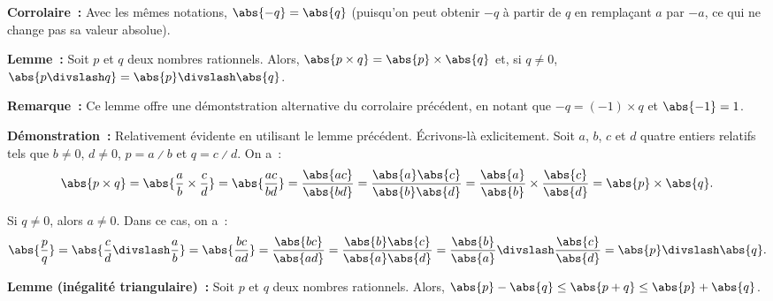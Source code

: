 \medskip

\noindent\textbf{Corrolaire :} Avec les mêmes notations, $\abs{-q} = \abs{q}$ (puisqu'on peut obtenir $-q$ à partir de $q$ en remplaçant $a$ par $-a$, ce qui ne change pas sa valeur absolue).

\medskip

\noindent\textbf{Lemme :} Soit $p$ et $q$ deux nombres rationnels.
    Alors, $\abs{p \times q} = \abs{p} \times \abs{q}$ et, si $q \neq 0$, $\abs{p \divslash q} = \abs{p} \divslash \abs{q}$.

\medskip

\noindent\textbf{Remarque :} Ce lemme offre une démontstration alternative du corrolaire précédent, en notant que $-q = (-1) \times q$ et $\abs{-1} = 1$.

\medskip

\noindent\textbf{Démonstration :} Relativement évidente en utilisant le lemme précédent. 
    Écrivons-là exlicitement.
    Soit $a$, $b$, $c$ et $d$ quatre entiers relatifs tels que $b \neq 0$, $d \neq 0$, $p = a \divslash b$ et $q = c \divslash d$.
    On a : 
    \begin{equation*}
        \abs{p \times q} 
        = \abs{\frac{a}{b} \times \frac{c}{d}}
        = \abs{\frac{a c}{b d}}
        = \frac{\abs{a c}}{\abs{b d}}
        = \frac{\abs{a} \abs{c}}{\abs{b} \abs{d}}
        = \frac{\abs{a}}{\abs{b}} \times \frac{\abs{c}}{\abs{d}}
        = \abs{p} \times \abs{q} .
    \end{equation*}

    Si $q \neq 0$, alors $a \neq 0$. 
    Dans ce cas, on a :
    \begin{equation*}
        \abs{\frac{p}{q}} 
        = \abs{\frac{c}{d} \divslash \frac{a}{b}}
        = \abs{\frac{b c}{a d}}
        = \frac{\abs{b c}}{\abs{a d}}
        = \frac{\abs{b} \abs{c}}{\abs{a} \abs{d}}
        = \frac{\abs{b}}{\abs{a}} \divslash \frac{\abs{c}}{\abs{d}}
        = \abs{p} \divslash \abs{q} .
    \end{equation*}
    
    \done

\medskip

\noindent\textbf{Lemme (inégalité triangulaire) :} Soit $p$ et $q$ deux nombres rationnels. 
    Alors, $\abs{p} - \abs{q} \leq \abs{p + q} \leq \abs{p} + \abs{q}$.

\medskip

